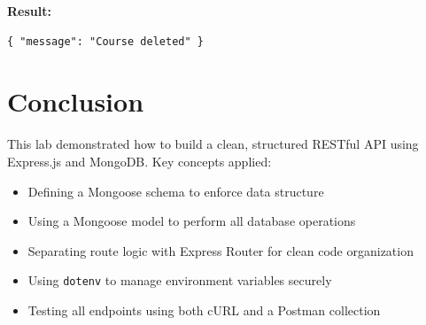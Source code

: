 \documentclass[12pt,a4paper]{article}
\begin{document}
\textbf{Result:}
\begin{lstlisting}
{ "message": "Course deleted" }
\end{lstlisting}

\section{Conclusion}
This lab demonstrated how to build a clean, structured RESTful API using Express.js and MongoDB. Key concepts applied:
\begin{itemize}
  \item Defining a Mongoose schema to enforce data structure
  \item Using a Mongoose model to perform all database operations
  \item Separating route logic with Express Router for clean code organization
  \item Using \texttt{dotenv} to manage environment variables securely
  \item Testing all endpoints using both cURL and a Postman collection
\end{itemize}
\end{document}
